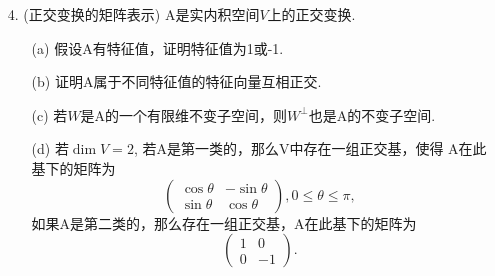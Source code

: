 \begin{itemize}
    \item[4.] (正交变换的矩阵表示) A是实内积空间$V$上的正交变换.
    \begin{itemize}
        \item [(a)] 假设A有特征值，证明特征值为1或-1.
        \vspace{2cm}
        
        \item [(b)] 证明A属于不同特征值的特征向量互相正交.
        \vspace{2cm}
        
        \item [(c)] 若$W$是A的一个有限维不变子空间，则$W^{\perp}$也是A的不变子空间.
        \vspace{2cm}

        \item [(d)] 若$\dim V = 2$, 若A是第一类的，那么V中存在一组正交基，使得
        A在此基下的矩阵为
        \begin{equation}
        \nonumber
        \begin{pmatrix}
            \cos \theta& -\sin \theta\\
            \sin \theta&  \cos \theta 
        \end{pmatrix},
        0 \le \theta \le \pi,
        \end{equation}
        如果A是第二类的，那么存在一组正交基，A在此基下的矩阵为
        \begin{equation}
        \nonumber
        \begin{pmatrix}
            1& 0\\
            0&-1 
        \end{pmatrix}.
        \end{equation}
        \vspace{1cm}


\end{itemize}
\end{itemize}
